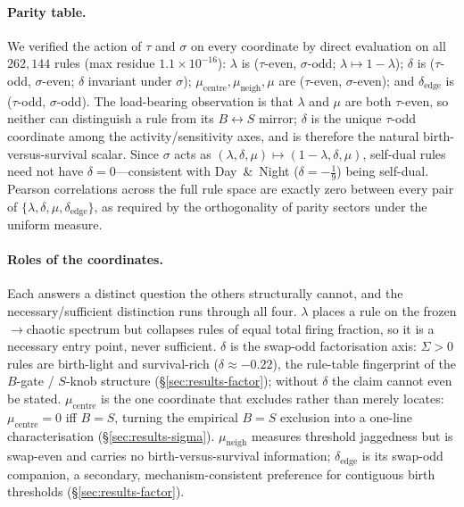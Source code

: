 \documentclass{article}
\begin{document}
\paragraph{Parity table.}
We verified the action of $\tau$ and $\sigma$ on every coordinate by direct
evaluation on all $262{,}144$ rules (max residue $1.1\times10^{-16}$): $\lambda$
is ($\tau$-even, $\sigma$-odd; $\lambda\mapsto1-\lambda$); $\delta$ is
($\tau$-odd, $\sigma$-even; $\delta$ invariant under $\sigma$);
$\mu_{\text{centre}},\mu_{\text{neigh}},\mu$ are ($\tau$-even, $\sigma$-even); and
$\delta_{\text{edge}}$ is ($\tau$-odd, $\sigma$-odd). The load-bearing
observation is that $\lambda$ and $\mu$ are both $\tau$-even, so neither can
distinguish a rule from its $B\leftrightarrow S$ mirror; $\delta$ is the unique
$\tau$-odd coordinate among the activity/sensitivity axes, and is therefore the
natural birth-versus-survival scalar. Since $\sigma$ acts as
$(\lambda,\delta,\mu)\mapsto(1-\lambda,\delta,\mu)$, self-dual rules need not have
$\delta=0$---consistent with Day~\&~Night ($\delta=-\tfrac19$) being self-dual.
Pearson correlations across the full rule space are exactly zero between every
pair of $\{\lambda,\delta,\mu,\delta_{\text{edge}}\}$, as required by the
orthogonality of parity sectors under the uniform measure.

\paragraph{Roles of the coordinates.}
Each answers a distinct question the others structurally cannot, and the
necessary/sufficient distinction runs through all four. $\lambda$ places a rule on
the frozen$\to$chaotic spectrum but collapses rules of equal total firing
fraction, so it is a necessary entry point, never sufficient. $\delta$ is the
swap-odd factorisation axis: $\Sigma>0$ rules are birth-light and survival-rich
($\delta\approx-0.22$), the rule-table fingerprint of the $B$-gate / $S$-knob
structure (\S\ref{sec:results-factor}); without $\delta$ the claim cannot even be
stated. $\mu_{\text{centre}}$ is the one coordinate that excludes rather than
merely locates: $\mu_{\text{centre}}=0$ iff $B=S$, turning the empirical $B=S$
exclusion into a one-line characterisation (\S\ref{sec:results-sigma}).
$\mu_{\text{neigh}}$ measures threshold jaggedness but is swap-even and carries no
birth-versus-survival information; $\delta_{\text{edge}}$ is its swap-odd
companion, a secondary, mechanism-consistent preference for contiguous birth
thresholds (\S\ref{sec:results-factor}).
\end{document}
